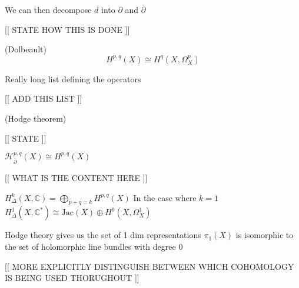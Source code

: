 We can then decompose $ d$ into $ \partial$ and $ \bar{\partial} $ 

[[ STATE HOW THIS IS DONE ]] 

\begin{theorem}
    (Dolbeault) 
    \begin{equation}
        H^{p,q} ( X) \cong H^q ( X, \Omega ^p _X ) 
    \end{equation}
\end{theorem}

Really long list defining the operators 

[[ ADD THIS LIST ]] 

\begin{theorem}
    (Hodge theorem) 
    
    [[ STATE ]] 
\end{theorem}

\begin{theorem}
    $ \mathcal{H} ^{p,q} _{\bar{\partial} } (X) \cong H^{p,q} (X) $ 
    
    [[ WHAT IS THE CONTENT HERE ]] 
\end{theorem}

\begin{theorem}
    $H^k _{\Delta } ( X, \mathbb{C} ) = \bigoplus _{p+q = k }  H^{p,q} ( X) $
    In the case where $ k = 1 $
    $H^1 _\Delta ( X, \mathbb{C}  ^* ) \cong \mathrm{Jac} (X) \oplus H^0 ( X, \Omega_X ^ 1) $
\end{theorem}


Hodge theory gives us the set of 1 dim representations $\pi_1(X) $ is isomorphic to the set of holomorphic line bundles with degree 0 


[[ MORE EXPLICITLY DISTINGUISH BETWEEN WHICH COHOMOLOGY IS BEING USED THORUGHOUT ]] 




 

